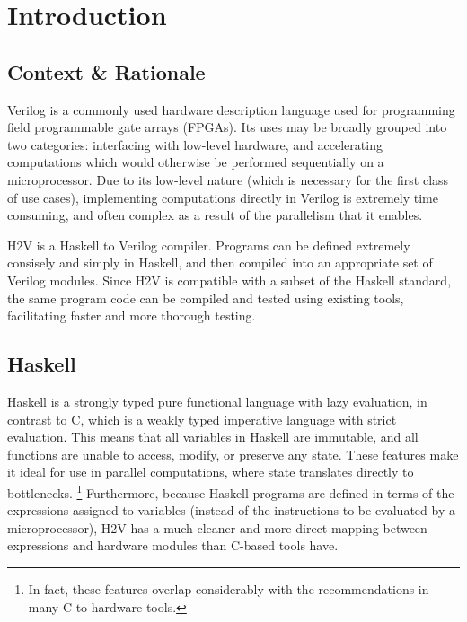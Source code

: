 \documentclass[english,onecolumn]{scrartcl}
\begin{document}
\newcommand\invisiblesection[1]{%
    \refstepcounter{section}%
    \addcontentsline{toc}{section}{\protect\numberline{\thesection}#1}%
    \sectionmark{#1}}

\begin{titlepage}

\end{titlepage}

\section{Introduction}
\subsection{Context \& Rationale}
Verilog is a commonly used hardware description language used for programming field programmable gate arrays (FPGAs).
Its uses may be broadly grouped into two categories: interfacing with low-level hardware, and accelerating computations which
would otherwise be performed sequentially on a microprocessor. Due to its low-level nature (which is necessary for the first class
of use cases), implementing computations directly in Verilog is extremely time consuming, and often complex as a result of the
parallelism that it enables.

H2V is a Haskell to Verilog compiler. Programs can be defined extremely consisely and simply in Haskell, and then compiled into an
appropriate set of Verilog modules. Since H2V is compatible with a subset of the Haskell standard, the same program code can be
compiled and tested using existing tools, facilitating faster and more thorough testing.

\subsection{Haskell}
Haskell is a strongly typed pure functional language with lazy evaluation, in contrast to C, which is a weakly typed imperative
language with strict evaluation. This means that all variables in Haskell are immutable, and all functions are unable to access,
modify, or preserve any state. These features make it ideal for use in parallel computations, where state translates directly to
bottlenecks.%
\footnote{In fact, these features overlap considerably with the recommendations in many C to hardware tools.\cite{C2H_UG}}
Furthermore, because Haskell programs are defined in terms of the expressions assigned to variables (instead of the instructions
to be evaluated by a microprocessor), H2V has a much cleaner and more direct mapping between expressions and hardware modules than
C-based tools have.
\end{document}
